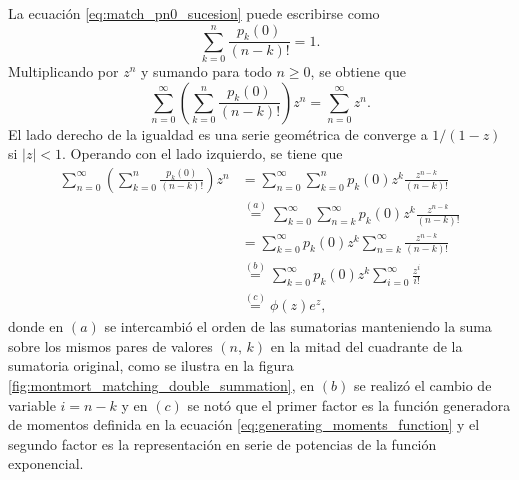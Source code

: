 \documentclass[a4paper]{report}
\begin{document}
La ecuación \ref{eq:match_pn0_sucesion} puede escribirse como
\[
 \sum_{k=0}^{n}\frac{p_k(0)}{(n-k)!}=1.
\]
Multiplicando por \(z^n\) y sumando para todo \(n\geq0\), se obtiene que
\begin{equation}\label{eq:match_phi_deduction_1}
 \sum_{n=0}^{\infty}\left(\sum_{k=0}^{n}\frac{p_k(0)}{(n-k)!}\right)z^n=\sum_{n=0}^{\infty}z^n.
\end{equation}
El lado derecho de la igualdad es una serie geométrica de converge a \(1/(1-z)\) si \(|z|<1\). Operando con el lado izquierdo, se tiene que
\begin{align}\label{eq:match_phi_deduction_2}
 \sum_{n=0}^{\infty}\left(\sum_{k=0}^{n}\frac{p_k(0)}{(n-k)!}\right)z^n 
 &= \sum_{n=0}^{\infty}\sum_{k=0}^{n}p_k(0)z^k\frac{z^{n-k}}{(n-k)!} \nonumber\\
 &\overset{(a)}{=} \sum_{k=0}^{\infty}\sum_{n=k}^{\infty}p_k(0)z^k\frac{z^{n-k}}{(n-k)!}\nonumber\\
 &= \sum_{k=0}^{\infty}p_k(0)z^k\sum_{n=k}^{\infty}\frac{z^{n-k}}{(n-k)!}\nonumber\\
 &\overset{(b)}{=} \sum_{k=0}^{\infty}p_k(0)z^k\sum_{i=0}^{\infty}\frac{z^{i}}{i!}\nonumber\\
 &\overset{(c)}{=}\phi(z)e^z,
\end{align}
donde en \((a)\) se intercambió el orden de las sumatorias manteniendo la suma sobre los mismos pares de valores \((n,\,k)\) en la mitad del cuadrante de la sumatoria original, como se ilustra en la figura \ref{fig:montmort_matching_double_summation}, en \((b)\) se realizó el cambio de variable \(i=n-k\) y en \((c)\) se notó que el primer factor es la función generadora de momentos definida en la ecuación \ref{eq:generating_moments_function} y el segundo factor es la representación en serie de potencias de la función exponencial.
\end{document}

